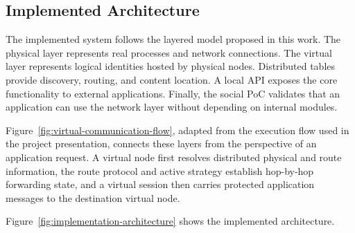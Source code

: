 \documentclass[12pt,a4paper]{article}
\begin{document}
\subsection{Implemented Architecture}
\label{sec:implemented-architecture}

The implemented system follows the layered model proposed in this work. The physical layer represents real processes and network connections. The virtual layer represents logical identities hosted by physical nodes. Distributed tables provide discovery, routing, and content location. A local API exposes the core functionality to external applications. Finally, the social PoC validates that an application can use the network layer without depending on internal modules.

Figure~\ref{fig:virtual-communication-flow}, adapted from the execution flow used in the project presentation, connects these layers from the perspective of an application request. A virtual node first resolves distributed physical and route information, the route protocol and active strategy establish hop-by-hop forwarding state, and a virtual session then carries protected application messages to the destination virtual node.

\thesisvirtualcommunicationflowtikz

Figure~\ref{fig:implementation-architecture} shows the implemented architecture.
\end{document}
